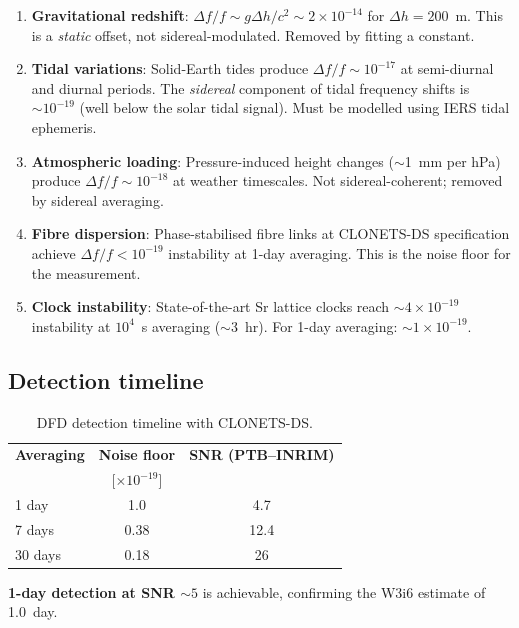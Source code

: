 \documentclass[11pt]{article}
\newcommand{\ee}[1]{\times 10^{#1}}
\begin{document}
\begin{enumerate}
\item \textbf{Gravitational redshift}: $\Delta f/f \sim g\Delta h/c^2
  \sim 2\ee{-14}$ for $\Delta h = 200$~m. This is a \emph{static}
  offset, not sidereal-modulated. Removed by fitting a constant.

\item \textbf{Tidal variations}: Solid-Earth tides produce
  $\Delta f/f \sim 10^{-17}$ at semi-diurnal and diurnal periods.
  The \emph{sidereal} component of tidal frequency shifts is
  $\sim 10^{-19}$ (well below the solar tidal signal). Must be
  modelled using IERS tidal ephemeris.

\item \textbf{Atmospheric loading}: Pressure-induced height changes
  ($\sim$1~mm per hPa) produce $\Delta f/f \sim 10^{-18}$ at
  weather timescales. Not sidereal-coherent; removed by sidereal
  averaging.

\item \textbf{Fibre dispersion}: Phase-stabilised fibre links at
  CLONETS-DS specification achieve $\Delta f/f < 10^{-19}$ instability
  at 1-day averaging. This is the noise floor for the measurement.

\item \textbf{Clock instability}: State-of-the-art Sr lattice clocks
  reach $\sim 4\ee{-19}$ instability at $10^4$~s averaging
  ($\sim$3~hr). For 1-day averaging: $\sim 1\ee{-19}$.
\end{enumerate}

\subsection{Detection timeline}

\begin{table}[H]
\centering
\caption{DFD detection timeline with CLONETS-DS.}
\begin{tabular}{lcc}
\toprule
\textbf{Averaging} & \textbf{Noise floor} & \textbf{SNR (PTB--INRIM)} \\
& [$\times 10^{-19}$] & \\
\midrule
1 day & 1.0 & 4.7 \\
7 days & 0.38 & 12.4 \\
30 days & 0.18 & 26 \\
\bottomrule
\end{tabular}
\end{table}

\textbf{1-day detection at SNR $\sim 5$} is achievable, confirming the
W3i6 estimate of 1.0~day.
\end{document}
